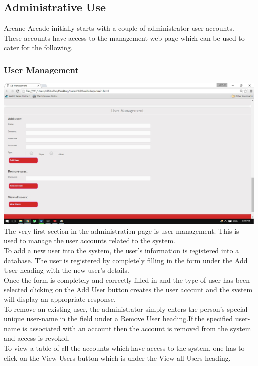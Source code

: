\documentclass[english]{article}
\begin{document}
		\subsection{Administrative Use}
		Arcane Arcade initially starts with a couple of administrator user accounts. These accounts have access to the management web page which can be used to cater for the following.
			\subsubsection{User Management}
				\includegraphics[width=\linewidth]{UserManagement.jpg}
				The very first section in the administration page is user management. This is used to manage the user accounts related to the system.
				\\[12pt]
				To add a new user into the system, the user's information is registered into a database. The user is registered by completely filling in the form under the Add User heading with the new user's details. 
				\\[12pt]
				Once the form is completely and correctly filled in and the type of user has been selected clicking on the Add User button creates the user account and the system will display an appropriate response.
				\\[12pt]	
				To remove an existing user, the administrator simply enters the person's special unique user-name in the field under a Remove User heading.If the specified user-name is associated with an account then the account is removed from the system and access is revoked.
					\\[12pt]
				To view a table of all the accounts which have access to the system, one has to click on the View Users button which is under the View all Users heading.	
				
\end{document}
